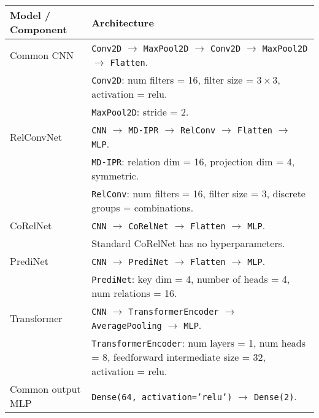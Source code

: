\begin{tabular}{p{}p{}}
    \toprule
    Model / Component & Architecture                                                                                                                                                                                                                                                                                       \\ \midrule
    Common CNN        & \texttt{Conv2D} $\to$ \texttt{MaxPool2D} $\to$ \texttt{Conv2D} $\to$ \texttt{MaxPool2D} $\to$ \texttt{Flatten}. \\
    & \texttt{Conv2D}: num filters = 16, filter size = $3 \times 3$, activation = relu. \\
    & \texttt{MaxPool2D}: stride = 2. \\\hline
    RelConvNet        & \texttt{CNN} $\to$ \texttt{MD-IPR} $\to$ \texttt{RelConv} $\to$ \texttt{Flatten} $\to$ \texttt{MLP}. \\
    & \texttt{MD-IPR}: relation dim = 16, projection dim = 4, symmetric. \\
    & \texttt{RelConv}: num filters = 16, filter size = 3, discrete groups = combinations. \\\hline
    CoRelNet          & \texttt{CNN} $\to$ \texttt{CoRelNet} $\to$ \texttt{Flatten} $\to$ \texttt{MLP}. \\
    & Standard CoRelNet has no hyperparameters. \\\hline
    PrediNet          & \texttt{CNN} $\to$ \texttt{PrediNet} $\to$ \texttt{Flatten} $\to$ \texttt{MLP}. \\
    & \texttt{PrediNet}: key dim = 4, number of heads = 4, num relations = 16. \\\hline
    Transformer       & \texttt{CNN} $\to$ \texttt{TransformerEncoder} $\to$ \texttt{AveragePooling} $\to$ \texttt{MLP}. \\
    & \texttt{TransformerEncoder}: num layers = 1, num heads = 8, feedforward intermediate size = 32, activation = relu. \\\hline
    Common output MLP & \texttt{Dense(64, activation='relu')} $\to$ \texttt{Dense(2)}.                                                                                                                                                                                                              \\ \bottomrule
\end{tabular}
